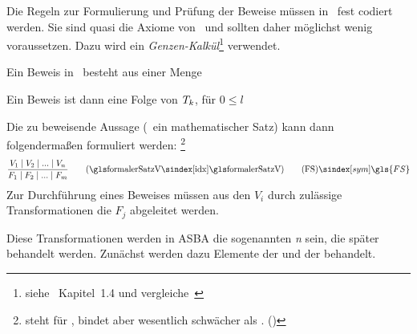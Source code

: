Die Regeln zur Formulierung und Prüfung der Beweise müssen in \ASBA\ fest codiert werden.
Sie sind quasi die Axiome von \ASBA\ und sollten daher möglichst wenig voraussetzen.
Dazu wird ein \emph{Genzen-Kalkül}\footnote{%
	siehe~\cite{bib:Rautenberg} Kapitel~1.4 und vergleiche~\cite{bib:Schlussregel,bib:NatuerlichesSchliessen}%
} verwendet.

Ein Beweis in \ASBA\ besteht aus einer Menge %

Ein Beweis ist dann eine Folge von $T_k$, für $0 \le l$

Die zu beweisende Aussage (\textzB\ ein mathematischer Satz) kann dann folgendermaßen formuliert werden:%
\footnote{%
	\symqt{$\srand$} steht für , bindet aber wesentlich schwächer als . ()
}
\[
\frac{V_1 \srand V_2 \srand ... \srand V_n}{F_1 \srand F_2 \srand ... \srand F_m}
\qquad \text{(\glsIdx{formalerSatzV})}
\tag{\tagFS} \sym{\gls{FS}} \label{def:formalerSatz}
\]
Zur Durchführung eines Beweises müssen aus den $V_i$ durch zulässige Transformationen die $F_j$ abgeleitet werden.


Diese Transformationen werden in ASBA die sogenannten \emph{n} sein, die später behandelt werden.
Zunächst werden dazu Elemente der \emph{} und der \emph{} behandelt.


